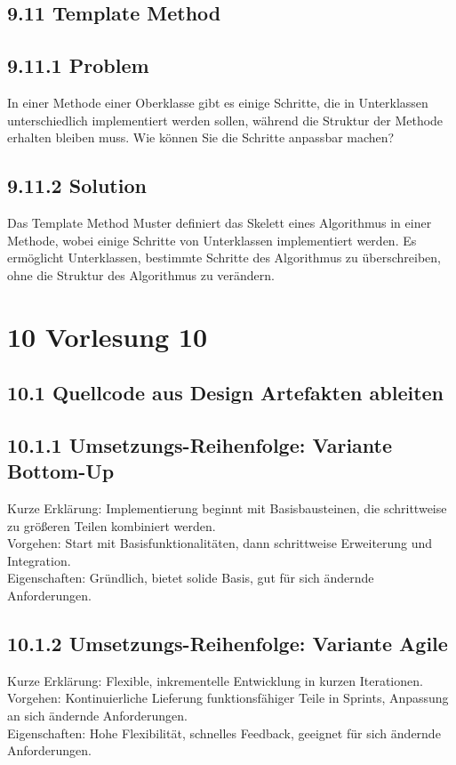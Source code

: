 \documentclass[10pt]{article}
\begin{document}
\subsection*{9.11 Template Method}
\subsection*{9.11.1 Problem}
In einer Methode einer Oberklasse gibt es einige Schritte, die in Unterklassen unterschiedlich implementiert werden sollen, während die Struktur der Methode erhalten bleiben muss. Wie können Sie die Schritte anpassbar machen?

\subsection*{9.11.2 Solution}
Das Template Method Muster definiert das Skelett eines Algorithmus in einer Methode, wobei einige Schritte von Unterklassen implementiert werden. Es ermöglicht Unterklassen, bestimmte Schritte des Algorithmus zu überschreiben, ohne die Struktur des Algorithmus zu verändern.

\section*{10 Vorlesung 10}
\subsection*{10.1 Quellcode aus Design Artefakten ableiten}
\subsection*{10.1.1 Umsetzungs-Reihenfolge: Variante Bottom-Up}
Kurze Erklärung: Implementierung beginnt mit Basisbausteinen, die schrittweise zu größeren Teilen kombiniert werden.\\
Vorgehen: Start mit Basisfunktionalitäten, dann schrittweise Erweiterung und Integration.\\
Eigenschaften: Gründlich, bietet solide Basis, gut für sich ändernde Anforderungen.

\subsection*{10.1.2 Umsetzungs-Reihenfolge: Variante Agile}
Kurze Erklärung: Flexible, inkrementelle Entwicklung in kurzen Iterationen. Vorgehen: Kontinuierliche Lieferung funktionsfähiger Teile in Sprints, Anpassung an sich ändernde Anforderungen.\\
Eigenschaften: Hohe Flexibilität, schnelles Feedback, geeignet für sich ändernde Anforderungen.
\end{document}
